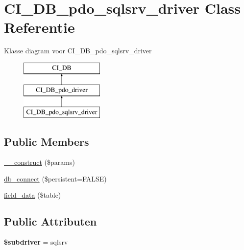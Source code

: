 \hypertarget{class_c_i___d_b__pdo__sqlsrv__driver}{}\section{C\+I\+\_\+\+D\+B\+\_\+pdo\+\_\+sqlsrv\+\_\+driver Class Referentie}
\label{class_c_i___d_b__pdo__sqlsrv__driver}
Klasse diagram voor C\+I\+\_\+\+D\+B\+\_\+pdo\+\_\+sqlsrv\+\_\+driver\begin{figure}[H]
\begin{center}
\leavevmode
\includegraphics[height=3.000000cm]{class_c_i___d_b__pdo__sqlsrv__driver}
\end{center}
\end{figure}
\subsection*{Public Members}
\begin{DoxyCompactItemize}
\item 
\mbox{\hyperlink{class_c_i___d_b__pdo__sqlsrv__driver_a9162320adff1a1a4afd7f2372f753a3e}{\+\_\+\+\_\+construct}} (\$params)
\item 
\mbox{\hyperlink{class_c_i___d_b__pdo__sqlsrv__driver_a52bf595e79e96cc0a7c907a9b45aeb4d}{db\+\_\+connect}} (\$persistent=F\+A\+L\+SE)
\item 
\mbox{\hyperlink{class_c_i___d_b__pdo__sqlsrv__driver_a90355121e1ed009e0efdbd544ab56efa}{field\+\_\+data}} (\$table)
\end{DoxyCompactItemize}
\subsection*{Public Attributen}
\begin{DoxyCompactItemize}
\item 
\mbox{\label{class_c_i___d_b__pdo__sqlsrv__driver_a1322ca756348b11d080cb7a4f590de15}} 
{\bfseries \$subdriver} = \textquotesingle{}sqlsrv\textquotesingle{}
\end{DoxyCompactItemize}
